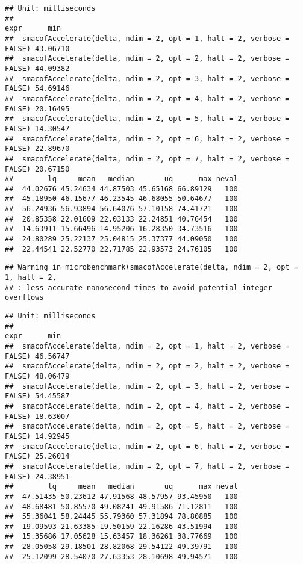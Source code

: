 \documentclass[
  12pt,
]{article}
\begin{document}
\begin{verbatim}
## Unit: milliseconds
##                                                                   expr      min
##  smacofAccelerate(delta, ndim = 2, opt = 1, halt = 2, verbose = FALSE) 43.06710
##  smacofAccelerate(delta, ndim = 2, opt = 2, halt = 2, verbose = FALSE) 44.09382
##  smacofAccelerate(delta, ndim = 2, opt = 3, halt = 2, verbose = FALSE) 54.69146
##  smacofAccelerate(delta, ndim = 2, opt = 4, halt = 2, verbose = FALSE) 20.16495
##  smacofAccelerate(delta, ndim = 2, opt = 5, halt = 2, verbose = FALSE) 14.30547
##  smacofAccelerate(delta, ndim = 2, opt = 6, halt = 2, verbose = FALSE) 22.89670
##  smacofAccelerate(delta, ndim = 2, opt = 7, halt = 2, verbose = FALSE) 20.67150
##        lq     mean   median       uq      max neval
##  44.02676 45.24634 44.87503 45.65168 66.89129   100
##  45.18950 46.15677 46.23545 46.68055 50.64677   100
##  56.24936 56.93894 56.64076 57.10158 74.41721   100
##  20.85358 22.01609 22.03133 22.24851 40.76454   100
##  14.63911 15.66496 14.95206 16.28350 34.73516   100
##  24.80289 25.22137 25.04815 25.37377 44.09050   100
##  22.44541 22.52770 22.71785 22.93573 24.76105   100
\end{verbatim}

\begin{verbatim}
## Warning in microbenchmark(smacofAccelerate(delta, ndim = 2, opt = 1, halt = 2,
## : less accurate nanosecond times to avoid potential integer overflows
\end{verbatim}

\begin{verbatim}
## Unit: milliseconds
##                                                                   expr      min
##  smacofAccelerate(delta, ndim = 2, opt = 1, halt = 2, verbose = FALSE) 46.56747
##  smacofAccelerate(delta, ndim = 2, opt = 2, halt = 2, verbose = FALSE) 48.06479
##  smacofAccelerate(delta, ndim = 2, opt = 3, halt = 2, verbose = FALSE) 54.45587
##  smacofAccelerate(delta, ndim = 2, opt = 4, halt = 2, verbose = FALSE) 18.63007
##  smacofAccelerate(delta, ndim = 2, opt = 5, halt = 2, verbose = FALSE) 14.92945
##  smacofAccelerate(delta, ndim = 2, opt = 6, halt = 2, verbose = FALSE) 25.26014
##  smacofAccelerate(delta, ndim = 2, opt = 7, halt = 2, verbose = FALSE) 24.38951
##        lq     mean   median       uq      max neval
##  47.51435 50.23612 47.91568 48.57957 93.45950   100
##  48.68481 50.85570 49.08241 49.91586 71.12811   100
##  55.36041 58.24445 55.79360 57.31894 78.80885   100
##  19.09593 21.63385 19.50159 22.16286 43.51994   100
##  15.35686 17.05628 15.63457 18.36261 38.77669   100
##  28.05058 29.18501 28.82068 29.54122 49.39791   100
##  25.12099 28.54070 27.63353 28.10698 49.94571   100
\end{verbatim}
\end{document}
